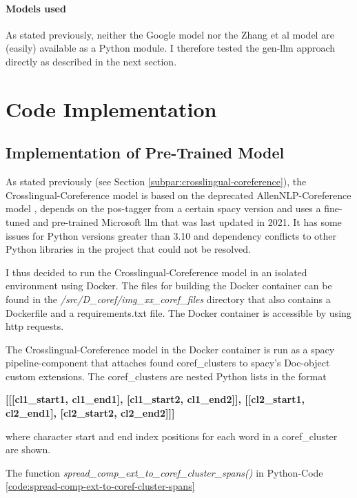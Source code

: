 \paragraph{Models used}
As stated previously, neither the Google \cite{CorefSeq2Seq} model nor the Zhang et al \cite{zhangcorefseq2seq} model are (easily) available as a Python module.
I therefore tested the \gls{gen-llm} approach directly as described in the next section.

\section{Code Implementation}
\subsection{Implementation of Pre-Trained Model}
As stated previously (see Section \ref{subpar:crosslingual-coreference}), the Crosslingual-Coreference model \cite{xxCoref} is based on the deprecated AllenNLP-Coreference model \cite{AllenNLPCorefModel}, depends on the \gls{pos}-tagger from a certain spacy version and uses a fine-tuned and pre-trained Microsoft \gls{llm} that was last updated in 2021.
It has some issues for Python versions greater than 3.10 and dependency conflicts to other Python libraries in the project that could not be resolved.


I thus decided to run the Crosslingual-Coreference model \cite{xxCoref} in an isolated environment using Docker.
The files for building the Docker container can be found in the \emph{/src/D\_coref/img\_xx\_coref\_files} directory that also contains a Dockerfile and a requirements.txt file.
The Docker container is accessible by using http requests.

The Crosslingual-Coreference model \cite{xxCoref} in the Docker container is run as a spacy pipeline-component that attaches found \glspl{coref_cluster} to spacy's Doc-object custom extensions.
The \glspl{coref_cluster} are nested Python lists in the format
\begin{center}
\scriptsize\textbf{{[[[cl1\_start1, cl1\_end1], [cl1\_start2, cl1\_end2]], [[cl2\_start1, cl2\_end1], [cl2\_start2, cl2\_end2]]]}}
\end{center}
where character start and end index positions for each word in a \gls{coref_cluster} are shown.

The function \emph{spread\_comp\_ext\_to\_coref\_cluster\_spans()} in Python-Code \ref{code:spread-comp-ext-to-coref-cluster-spans}


